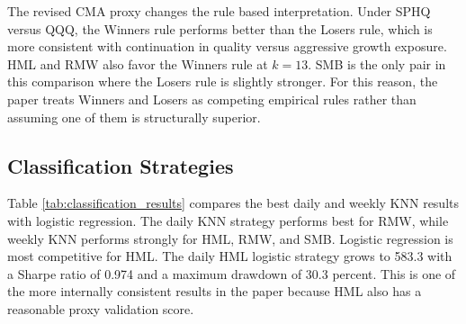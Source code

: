 \documentclass[investment,article,submit,pdftex,moreauthors]{Definitions/mdpi}
\begin{document}
\begin{table}[H]
\centering
\caption{Daily Winners and Losers comparison at \(k=13\)}
\label{tab:winners_losers_comparison}
\scriptsize
{}
\end{table}

The revised CMA proxy changes the rule based interpretation. Under SPHQ versus QQQ, the Winners rule performs better than the Losers rule, which is more consistent with continuation in quality versus aggressive growth exposure. HML and RMW also favor the Winners rule at \(k=13\). SMB is the only pair in this comparison where the Losers rule is slightly stronger. For this reason, the paper treats Winners and Losers as competing empirical rules rather than assuming one of them is structurally superior.

\subsection{Classification Strategies}

Table \ref{tab:classification_results} compares the best daily and weekly KNN results with logistic regression. The daily KNN strategy performs best for RMW, while weekly KNN performs strongly for HML, RMW, and SMB. Logistic regression is most competitive for HML. The daily HML logistic strategy grows to 583.3 with a Sharpe ratio of 0.974 and a maximum drawdown of 30.3 percent. This is one of the more internally consistent results in the paper because HML also has a reasonable proxy validation score.
\end{document}
